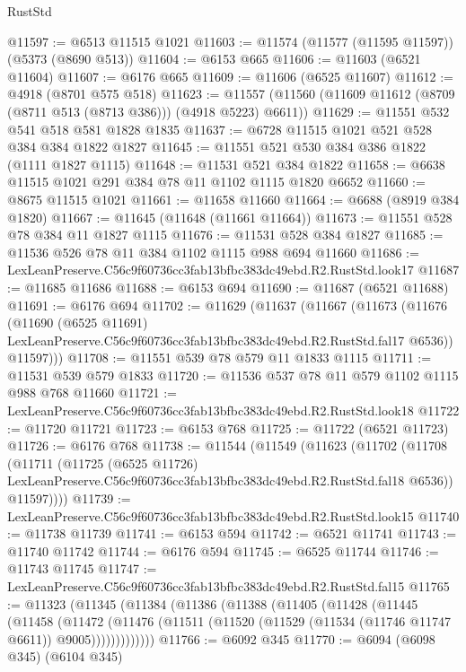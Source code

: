 \begin{lexlean}{RustStd}
\begin{coremodule}
@11597 := @6513 @11515 @1021
@11603 := @11574 (@11577 (@11595 @11597)) (@5373 (@8690 @513))
@11604 := @6153 @665
@11606 := @11603 (@6521 @11604)
@11607 := @6176 @665
@11609 := @11606 (@6525 @11607)
@11612 := @4918 (@8701 @575 @518)
@11623 := @11557 (@11560 (@11609 @11612 (@8709 (@8711 @513 (@8713 @386))) (@4918 @5223) @6611))
@11629 := @11551 @532 @541 @518 @581 @1828 @1835
@11637 := @6728 @11515 @1021 @521 @528 @384 @384 @1822 @1827
@11645 := @11551 @521 @530 @384 @386 @1822 (@1111 @1827 @1115)
@11648 := @11531 @521 @384 @1822
@11658 := @6638 @11515 @1021 @291 @384 @78 @11 @1102 @1115 @1820 @6652
@11660 := @8675 @11515 @1021
@11661 := @11658 @11660
@11664 := @6688 (@8919 @384 @1820)
@11667 := @11645 (@11648 (@11661 @11664))
@11673 := @11551 @528 @78 @384 @11 @1827 @1115
@11676 := @11531 @528 @384 @1827
@11685 := @11536 @526 @78 @11 @384 @1102 @1115 @988 @694 @11660
@11686 := LexLeanPreserve.C56c9f60736cc3fab13bfbc383dc49ebd.R2.RustStd.look17
@11687 := @11685 @11686
@11688 := @6153 @694
@11690 := @11687 (@6521 @11688)
@11691 := @6176 @694
@11702 := @11629
    (@11637
      (@11667
        (@11673
          (@11676
            (@11690
              (@6525 @11691)
              LexLeanPreserve.C56c9f60736cc3fab13bfbc383dc49ebd.R2.RustStd.fal17
              @6536))
          @11597)))
@11708 := @11551 @539 @78 @579 @11 @1833 @1115
@11711 := @11531 @539 @579 @1833
@11720 := @11536 @537 @78 @11 @579 @1102 @1115 @988 @768 @11660
@11721 := LexLeanPreserve.C56c9f60736cc3fab13bfbc383dc49ebd.R2.RustStd.look18
@11722 := @11720 @11721
@11723 := @6153 @768
@11725 := @11722 (@6521 @11723)
@11726 := @6176 @768
@11738 := @11544
    (@11549
      (@11623
        (@11702
          (@11708
            (@11711
              (@11725
                (@6525 @11726)
                LexLeanPreserve.C56c9f60736cc3fab13bfbc383dc49ebd.R2.RustStd.fal18
                @6536))
            @11597))))
@11739 := LexLeanPreserve.C56c9f60736cc3fab13bfbc383dc49ebd.R2.RustStd.look15
@11740 := @11738 @11739
@11741 := @6153 @594
@11742 := @6521 @11741
@11743 := @11740 @11742
@11744 := @6176 @594
@11745 := @6525 @11744
@11746 := @11743 @11745
@11747 := LexLeanPreserve.C56c9f60736cc3fab13bfbc383dc49ebd.R2.RustStd.fal15
@11765 := @11323
    (@11345
      (@11384
        (@11386
          (@11388
            (@11405
              (@11428
                (@11445
                  (@11458
                    (@11472
                      (@11476
                        (@11511 (@11520 (@11529 (@11534 (@11746 @11747 @6611)) @9005)))))))))))))
@11766 := @6092 @345
@11770 := @6094 (@6098 @345) (@6104 @345)

\end{coremodule}
\end{lexlean}
